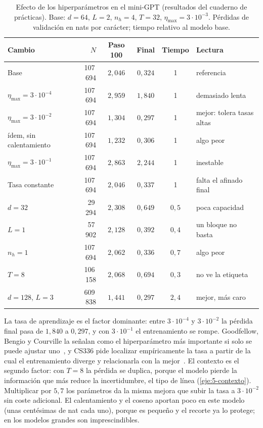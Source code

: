 \begin{table}[h]
\centering\small
\caption{Efecto de los hiperparámetros en el mini-GPT (resultados del cuaderno de prácticas). Base: $d=64$, $L=2$, $n_h=4$, $T=32$, $\eta_{\max}=3\cdot 10^{-3}$. Pérdidas de validación en nats por carácter; tiempo relativo al modelo base.}\label{tab:hiper}
\begin{tabularx}{\textwidth}{@{}lrccc>{\raggedright\arraybackslash}X@{}}
\toprule
Cambio & $N$ & Paso 100 & Final & Tiempo & Lectura \\
\midrule
Base & 107\,694 & $2{,}046$ & $0{,}324$ & 1 & referencia \\
$\eta_{\max}=3\cdot 10^{-4}$ & 107\,694 & $2{,}959$ & $1{,}840$ & 1 & demasiado lenta \\
$\eta_{\max}=3\cdot 10^{-2}$ & 107\,694 & $1{,}304$ & $0{,}297$ & 1 & mejor: tolera tasas altas \\
ídem, sin calentamiento & 107\,694 & $1{,}232$ & $0{,}306$ & 1 & algo peor \\
$\eta_{\max}=3\cdot 10^{-1}$ & 107\,694 & $2{,}863$ & $2{,}244$ & 1 & inestable \\
Tasa constante & 107\,694 & $2{,}046$ & $0{,}337$ & 1 & falta el afinado final \\
$d=32$ & 29\,294 & $2{,}308$ & $0{,}649$ & $0{,}5$ & poca capacidad \\
$L=1$ & 57\,902 & $2{,}128$ & $0{,}392$ & $0{,}4$ & un bloque no basta \\
$n_h=1$ & 107\,694 & $2{,}062$ & $0{,}336$ & $0{,}7$ & algo peor \\
$T=8$ & 106\,158 & $2{,}068$ & $0{,}694$ & $0{,}3$ & no ve la etiqueta \\
$d=128$, $L=3$ & 609\,838 & $1{,}441$ & $0{,}297$ & $2{,}4$ & mejor, más caro \\
\bottomrule
\end{tabularx}
\end{table}

La tasa de aprendizaje es el factor dominante: entre $3\cdot 10^{-4}$ y $3\cdot 10^{-2}$ la pérdida final pasa de $1{,}840$ a $0{,}297$, y con $3\cdot 10^{-1}$ el entrenamiento se rompe. Goodfellow, Bengio y Courville la señalan como el hiperparámetro más importante si solo se puede ajustar uno~\cite[§11.4.1]{gbc}, y CS336 pide localizar empíricamente la tasa a partir de la cual el entrenamiento diverge y relacionarla con la mejor~\cite[§7.2, problema \emph{learning\_rate}]{cs336}. El contexto es el segundo factor: con $T=8$ la pérdida se duplica, porque el modelo pierde la información que más reduce la incertidumbre, el tipo de línea (\cref{eje:5-contexto}). Multiplicar por $5{,}7$ los parámetros da la misma mejora que subir la tasa a $3\cdot 10^{-2}$ sin coste adicional. El calentamiento y el coseno aportan poco en este modelo (unas centésimas de nat cada uno), porque es pequeño y el recorte ya lo protege; en los modelos grandes son imprescindibles.

